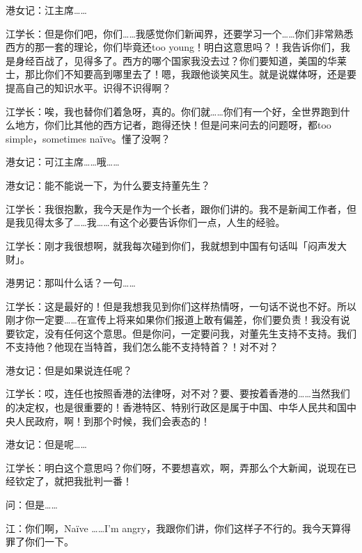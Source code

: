 港女记：江主席……

江学长：但是你们吧，你们……我感觉你们新闻界，还要学习一个……你们非常熟悉西方的那一套的理论，你们毕竟还too young！明白这意思吗？！我告诉你们，我是身经百战了，见得多了。西方的哪个国家我没去过？你们要知道，美国的华莱士，那比你们不知要高到哪里去了！嗯，我跟他谈笑风生。就是说媒体呀，还是要提高自己的知识水平。识得不识得啊？

江学长：唉，我也替你们着急呀，真的。你们就……你们有一个好，全世界跑到什么地方，你们比其他的西方记者，跑得还快！但是问来问去的问题呀，都too simple，sometimes na\"ive。懂了没啊？

港女记：可江主席……哦……

港女记：能不能说一下，为什么要支持董先生？

江学长：我很抱歉，我今天是作为一个长者，跟你们讲的。我不是新闻工作者，但是我见得太多了……我……有这个必要告诉你们一点，人生的经验。

江学长：刚才我很想啊，就我每次碰到你们，我就想到中国有句话叫「闷声发大财」。

港男记：那叫什么话？一句……

江学长：这是最好的！但是我想我见到你们这样热情呀，一句话不说也不好。所以刚才你一定要……在宣传上将来如果你们报道上敢有偏差，你们要负责！我没有说要钦定，没有任何这个意思。但是你问，一定要问我，对董先生支持不支持。我们不支持他？他现在当特首，我们怎么能不支持特首？！对不对？

港女记：但是如果说连任呢？

江学长：哎，连任也按照香港的法律呀，对不对？要、要按着香港的……当然我们的决定权，也是很重要的！香港特区、特别行政区是属于中国、中华人民共和国中央人民政{}府，啊！到那个时候，我们会表态的！

港女记：但是呢……

江学长：明白这个意思吗？你们呀，不要想喜欢，啊，弄那么个大新闻，说现在已经钦定了，就把我批判一番！

问：但是……

江：你们啊，Na\"ive ……I'm angry，我跟你们讲，你们这样子不行的。我今天算得罪了你们一下。
